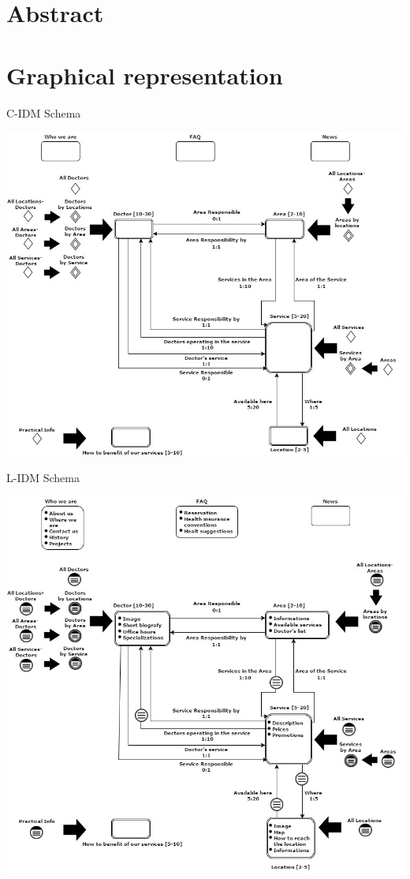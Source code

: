 \documentclass{../Common/Structure/doc_pdf}
\begin{document}
\titleToc

\chapter{Abstract}
\thispagestyle{fancy}

\chapter{Graphical representation}
\thispagestyle{fancy}

{\centering 
C-IDM Schema
\vspace{1cm}
\begin{center}
	\includegraphics[width=\textwidth]{Clinic_C_IDM.jpg}
\end{center}}

\newpage

{\centering 
L-IDM Schema
\vspace{1cm}
\begin{center}
	\includegraphics[width=\textwidth]{Clinic_L_IDM.jpg}
\end{center}}
\end{document}
